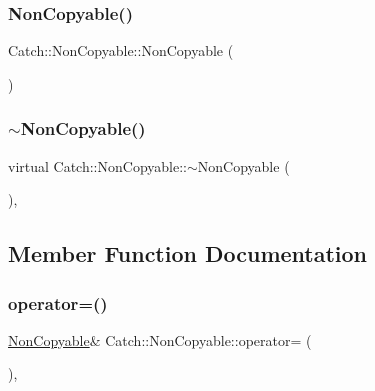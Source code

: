 \subsubsection{\texorpdfstring{NonCopyable()}{NonCopyable()}\hspace{0.1cm}{\footnotesize\ttfamily [3/3]}}
{\footnotesize\ttfamily Catch\+::\+Non\+Copyable\+::\+Non\+Copyable (\begin{DoxyParamCaption}{ }\end{DoxyParamCaption})\hspace{0.3cm}{\ttfamily [protected]}}

\mbox{\label{class_catch_1_1_non_copyable_a81254677280fef337eb4a676e91e3293}} 
\subsubsection{\texorpdfstring{$\sim$NonCopyable()}{~NonCopyable()}}
{\footnotesize\ttfamily virtual Catch\+::\+Non\+Copyable\+::$\sim$\+Non\+Copyable (\begin{DoxyParamCaption}{ }\end{DoxyParamCaption})\hspace{0.3cm}{\ttfamily [protected]}, {\ttfamily [virtual]}}



\subsection{Member Function Documentation}
\mbox{\label{class_catch_1_1_non_copyable_a958b5f57d45fdd6f418bec8b46a629ab}} 
\subsubsection{\texorpdfstring{operator=()}{operator=()}\hspace{0.1cm}{\footnotesize\ttfamily [1/2]}}
{\footnotesize\ttfamily \mbox{\hyperlink{class_catch_1_1_non_copyable}{Non\+Copyable}}\& Catch\+::\+Non\+Copyable\+::operator= (\begin{DoxyParamCaption}\item[{\mbox{\hyperlink{class_catch_1_1_non_copyable}{Non\+Copyable}} const \&}]{ }\end{DoxyParamCaption})\hspace{0.3cm}{\ttfamily [private]}, {\ttfamily [delete]}}

